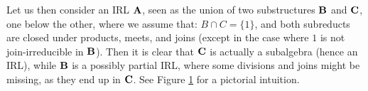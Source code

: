 \documentclass{amsart}
\theoremstyle{definition}
\numberwithin{equation}{section}
\newcommand{\alg}[1]{{\textbf{\upshape #1}}}  %
\begin{document}
 Let us then consider an IRL $\alg A$, seen as the union of two substructures $\alg B$ and $\alg C$, one below the other, where we assume that: $B \cap C = \{1\}$, and both subreducts are closed under products, meets, and joins (except in the case where $1$ is not join-irreducible in $\alg B$). Then it is clear that $\alg C$ is actually a subalgebra (hence an IRL), while $\alg B$ is a possibly partial IRL, where some divisions and joins might be missing, as they end up in $\alg C$. See Figure \ref{figure:gluing} for a pictorial intuition.
 
\begin{figure}
\begin{center}
\caption{}\label{figure:gluing}
   \end{center}  
\end{figure}
 
\end{document}
